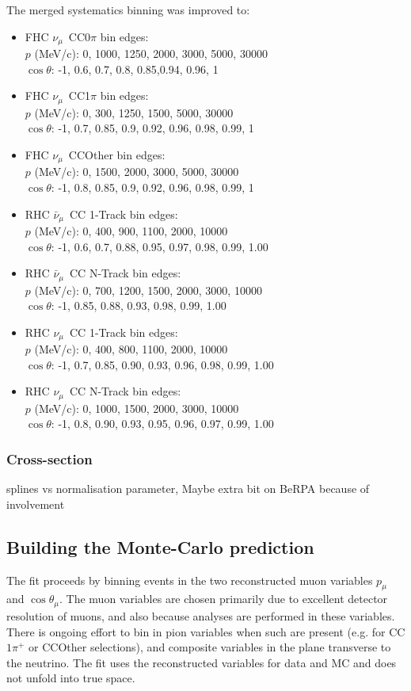 The merged systematics binning was improved to:
\begin{itemize}
	\item FHC $\nu_{\mu}$~CC0$\pi$ bin edges: \\
	$p$ (MeV/c): 0, 1000, 1250, 2000, 3000, 5000, 30000 \\
	$\cos\theta$:  -1, 0.6, 0.7, 0.8, 0.85,0.94, 0.96, 1
	\item FHC $\nu_{\mu}$~CC1$\pi$  bin edges: \\
	$p$ (MeV/c):  0, 300, 1250, 1500, 5000, 30000 \\
	$\cos\theta$: -1, 0.7, 0.85, 0.9, 0.92, 0.96, 0.98, 0.99, 1
	\item FHC $\nu_{\mu}$~CCOther bin edges: \\
	$p$ (MeV/c): 0, 1500, 2000, 3000, 5000, 30000 \\
	$\cos\theta$:  -1, 0.8, 0.85, 0.9, 0.92, 0.96, 0.98, 0.99, 1
	\item RHC $\bar{\nu}_{\mu}$~CC 1-Track bin edges: \\
	$p$ (MeV/c): 0, 400, 900, 1100, 2000, 10000 \\
	$\cos\theta$:  -1, 0.6, 0.7, 0.88, 0.95, 0.97, 0.98, 0.99, 1.00
	\item RHC $\bar{\nu}_{\mu}$~CC N-Track bin edges: \\
	$p$ (MeV/c):  0, 700, 1200, 1500, 2000, 3000, 10000 \\
	$\cos\theta$: -1, 0.85, 0.88, 0.93, 0.98, 0.99, 1.00
	\item RHC $\nu_{\mu}$~CC 1-Track bin edges: \\
	$p$ (MeV/c):  0, 400, 800, 1100, 2000, 10000 \\
	$\cos\theta$:   -1, 0.7, 0.85, 0.90, 0.93, 0.96, 0.98, 0.99, 1.00
	\item RHC $\nu_{\mu}$~CC N-Track bin edges: \\
	$p$ (MeV/c):  0, 1000, 1500, 2000, 3000, 10000 \\
	$\cos\theta$: -1, 0.8, 0.90, 0.93, 0.95, 0.96, 0.97, 0.99, 1.00
\end{itemize}

\subsubsection{Cross-section}
\label{subsec:ND280:syst:xsec}
splines vs normalisation parameter, Maybe extra bit on BeRPA because of involvement

\subsection{Building the Monte-Carlo prediction}
The fit proceeds by binning events in the two reconstructed muon variables $p_\mu$ and $\cos\theta_\mu$. The muon variables are chosen primarily due to excellent detector resolution of muons, and also because \sk analyses are performed in these variables. There is ongoing effort to bin in pion variables when such are present (e.g. for CC$1\pi^+$ or CCOther selections), and composite variables in the plane transverse to the neutrino. The fit uses the reconstructed variables for data and MC and does not unfold into true space.

